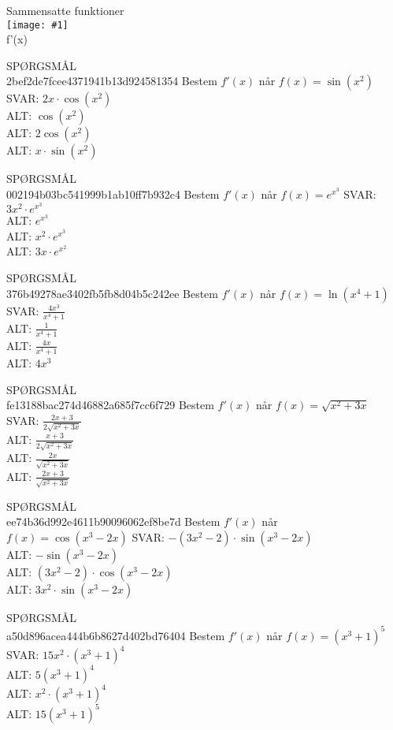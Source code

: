 \documentclass[]{article}
\newcounter{spgcounter}
\newenvironment{question}[2]{\addtocounter{spgcounter}{1} SPØRGSMÅL \thespgcounter\\}{\hspace{50px}}
\newcommand{\name}[1]{{\huge #1}\\}
\newcommand{\tag}[1]{#1}
\newcommand{\cover}[1]{\texttt{[image: \#1]}\\}
\newcommand{\answer}[1]{{\color{green} SVAR: #1}\\}
\newcommand{\alt}[1]{{\color{red} ALT: #1}\\}
\begin{document}
\name{Sammensatte funktioner}
\cover{kæderegelnonlinear.png}
\tag{f'(x)}

\begin{question}{multi}\id{2bef2de7fcee4371941b13d924581354}
    Bestem $f'(x)$ når $f(x)=\sin(x^2)$
    \answer{$2x \cdot \cos(x^2)$}
    \alt{$\cos(x^2)$}
    \alt{$2 \cos(x^2)$}
    \alt{$x \cdot \sin(x^2)$}
    \end{question}
    
    \begin{question}{multi}\id{002194b03bc541999b1ab10ff7b932c4}
    Bestem $f'(x)$ når $f(x)=e^{x^3}$
    \answer{$3x^2 \cdot e^{x^3}$}
    \alt{$e^{x^3}$}
    \alt{$x^2 \cdot e^{x^3}$}
    \alt{$3x \cdot e^{x^2}$}
    \end{question}
    
    \begin{question}{multi}\id{376b49278ae3402fb5fb8d04b5c242ee}
    Bestem $f'(x)$ når $f(x)=\ln(x^4 + 1)$
    \answer{$\frac{4x^3}{x^4 + 1}$}
    \alt{$\frac{1}{x^4 + 1}$}
    \alt{$\frac{4x}{x^4 + 1}$}
    \alt{$4x^3$}
    \end{question}
    
    \begin{question}{multi}\id{fe13188bac274d46882a685f7cc6f729}
    Bestem $f'(x)$ når $f(x)=\sqrt{x^2 + 3x}$
    \answer{$\frac{2x + 3}{2\sqrt{x^2 + 3x}}$}
    \alt{$\frac{x + 3}{2\sqrt{x^2 + 3x}}$}
    \alt{$\frac{2x}{\sqrt{x^2 + 3x}}$}
    \alt{$\frac{2x + 3}{\sqrt{x^2 + 3x}}$}
    \end{question}
    
    \begin{question}{multi}\id{ee74b36d992e4611b90096062ef8be7d}
    Bestem $f'(x)$ når $f(x)=\cos(x^3 - 2x)$
    \answer{$-(3x^2 - 2) \cdot \sin(x^3 - 2x)$}
    \alt{$-\sin(x^3 - 2x)$}
    \alt{$(3x^2 - 2) \cdot \cos(x^3 - 2x)$}
    \alt{$3x^2 \cdot \sin(x^3 - 2x)$}
    \end{question}
        
    \begin{question}{multi}\id{a50d896acea444b6b8627d402bd76404}
    Bestem $f'(x)$ når $f(x)=(x^3 + 1)^5$
    \answer{$15x^2 \cdot (x^3 + 1)^4$}
    \alt{$5(x^3 + 1)^4$}
    \alt{$x^2 \cdot (x^3 + 1)^4$}
    \alt{$15(x^3 + 1)^5$}
    \end{question}
\end{document}
